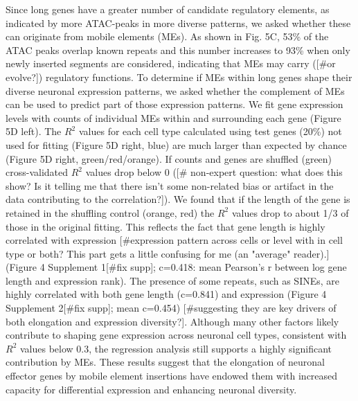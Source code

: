 Since long genes have a greater number of candidate regulatory elements, as indicated by more ATAC-peaks in more diverse patterns, we asked whether these can originate from mobile elements (MEs). As shown in Fig. 5C, 53\% of the ATAC peaks overlap known repeats and this number increases to 93\% when only newly inserted segments are considered, indicating that MEs may carry ([#or evolve?]) regulatory functions. To determine if MEs within long genes shape their diverse neuronal expression patterns, we asked whether the complement of MEs can be used to predict part of those expression patterns. We fit gene expression levels with counts of individual MEs within and surrounding each gene (Figure 5D left). The $R^2$ values for each cell type calculated using test genes (20\%) not used for fitting (Figure 5D right, blue) are much larger than expected by chance (Figure 5D right, green/red/orange). If counts and genes are shuffled (green) cross-validated $R^2$ values drop below 0 ([# non-expert question: what does this show? Is it telling me that there isn't some non-related bias or artifact in the data contributing to the correlation?]). We found that if the length of the gene is retained in the shuffling control (orange, red) the $R^2$ values drop to about 1/3 of those in the original fitting. This reflects the fact that gene length is highly correlated with expression [#expression pattern across cells or level with in cell type or both? This part gets a little confusing for me (an "average" reader).] (Figure 4 Supplement 1[#fix supp]; c=0.418: mean Pearson’s r between log gene length and expression rank). The presence of some repeats, such as SINEs, are highly correlated with both gene length (c=0.841) and expression (Figure 4 Supplement 2[#fix supp]; mean c=0.454) [#suggesting they are key drivers of both elongation and expression diversity?]. Although many other factors likely contribute to shaping gene expression across neuronal cell types, consistent with $R^2$ values below 0.3, the regression analysis still supports a highly significant contribution by MEs. These results suggest that the elongation of neuronal effector genes by mobile element insertions have endowed them with increased capacity for differential expression and enhancing neuronal diversity. 


